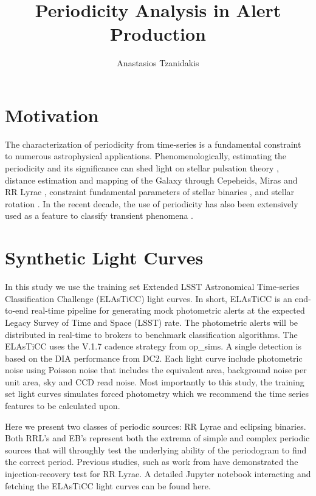 \documentclass[DM,authoryear,toc]{lsstdoc}
\title{Periodicity Analysis in Alert Production}
\author{%
Anastasios Tzanidakis
}
\date{\vcsDate}
\begin{document}
\maketitle


\section{Motivation}
The characterization of periodicity from time-series is a fundamental constraint to numerous astrophysical applications. Phenomenologically, estimating the periodicity and its significance can shed light on stellar pulsation theory \citep{Antonello:Antonello81}, distance estimation and mapping of the Galaxy through Cepeheids, Miras and RR Lyrae \citep{Skowron:Skowron2019}, constraint fundamental parameters of stellar binaries \citep{Farinella:Farinella1979}, and stellar rotation \citep{Walkowicz:Walkowicz13}. In the recent decade, the use of periodicity has also been extensively used as a feature to classify transient phenomena \citep{Richards:R13}.



\section{Synthetic Light Curves}


In this study we use the training set Extended LSST Astronomical Time-series Classification Challenge (ELAsTiCC) light curves. In short, ELAsTiCC is an end-to-end real-time pipeline for generating mock photometric alerts at the expected Legacy Survey of Time and Space (LSST) rate. The photometric alerts will be distributed in real-time to brokers to benchmark classification algorithms. The ELAsTiCC uses the V.1.7 cadence strategy from op_sims. A single detection is based on the DIA performance from DC2. Each light curve include photometric noise using Poisson noise that includes the equivalent area, background noise per unit area, sky and CCD read noise. Most importantly to this study, the training set light curves simulates forced photometry which we recommend the time series features to be calculated upon.   

Here we present two classes of periodic sources: RR Lyrae and eclipsing binaries. Both RRL's and EB's represent both the extrema of simple and complex periodic sources that will throughly test the underlying ability of the periodogram to find the correct period. Previous studies, such as work from \cite{Oluseyi:Oluseyi2012} have demonstrated the injection-recovery test for RR Lyrae. A detailed Jupyter notebook interacting and fetching the ELAsTiCC light curves can be found here. 
\end{document}
